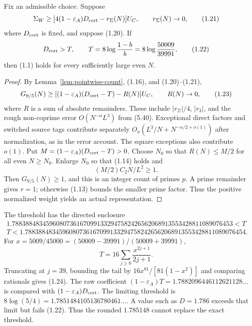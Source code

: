 \begin{theorem}
Fix an admissible choice. Suppose
\[
 \Sigma_W\ge[4(1-\varepsilon_A)D_{\rm cert}-r_\Sigma(N)]U_C,
 \qquad r_\Sigma(N)\to0,                                   \tag{1.21}
\]
where $D_{\rm cert}$ is fixed, and suppose (1.20).
If
\[
 D_{\rm cert}>T,\qquad
 T=8\log\frac{1-b}{b}=8\log\frac{50009}{39991},              \tag{1.22}
\]
then (1.1) holds for every sufficiently large even $N$.
\end{theorem}
\begin{proof}
By Lemma~\ref{lem:pointwise-count}, (1.16), and (1.20)--(1.21),
\[
 G_{9/5}(N)\ge
   [(1-\varepsilon_A)(D_{\rm cert}-T)-R(N)]U_C,
 \qquad R(N)\to0,                                         \tag{1.23}
\]
where $R$ is a sum of absolute remainders.
These include $|r_\Sigma|/4$, $|r_3|$, and the rough non-coprime error
$O(N^{-\alpha}L^3)$ from (5.40). Exceptional direct factors and switched
source tags contribute separately
$O_\sigma(L^3/N+N^{-\alpha/2+o(1)})$ after normalization, as in the
error account. The square exceptions also contribute $o(1)$.
Put $M=(1-\varepsilon_A)(D_{\rm cert}-T)>0$.
Choose $N_0$ so that $R(N)\le M/2$ for all even $N\ge N_0$.
Enlarge $N_0$ so that (1.14) holds and
\[
 (M/2)C_2N/L^2\ge1.
\]
Then $G_{9/5}(N)\ge1$, and this is an integer count of primes $p$.
A prime remainder gives $r=1$;
otherwise (1.13) bounds the smaller prime factor.
Thus the positive normalized weight yields an actual representation.
\end{proof}

The threshold has the directed enclosure
\begingroup\footnotesize
\[
 \begin{gathered}
 1.78838848345960807361670991332947582426562068913553428811089076453<T\\[-2pt]
 T<1.78838848345960807361670991332947582426562068913553428811089076454.
 \end{gathered}                                             \tag{1.24}
\]
\endgroup
For $x=5009/45000=(50009-39991)/(50009+39991)$,
\[
 T=16\sum_{j\ge0}\frac{x^{2j+1}}{2j+1}.
\]
Truncating at $j=39$, bounding the tail by
$16x^{81}/[81(1-x^2)]$ and comparing rationals gives (1.24).
The raw coefficient
$(1-\varepsilon_A)T=1.7882096446112621128\ldots$
is compared with $(1-\varepsilon_A)D_{\rm cert}$.
The limiting threshold is
$8\log(5/4)=1.7851484105136780461\ldots$.
A value such as $D=1.786$ exceeds that limit but fails (1.22).
Thus the rounded $1.785148$ cannot replace the exact threshold.

